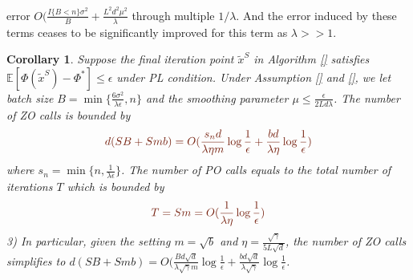 \documentclass{article}
\newcommand*{\E}{\mathbb{E}}
\newtheorem{corollary}[theorem]{Corollary}
\theoremstyle{definition}
\theoremstyle{remark}
\begin{document}
error $O(\frac{I\{B < n\} \sigma ^2}{B}+\frac{L^2 d^2 \mu^2}{\lambda}$ through multiple $1/\lambda$. And the error induced by these terms ceases to be significantly improved for this term as $\lambda >> 1$.
\begin{corollary}\label{PL-Zo-Cor}
Suppose the final iteration point $\tilde{x}^S$ in Algorithm \ref{} satisfies $\E[\Phi(\tilde{x}^S) - \Phi^*]\leq \epsilon$ under PL condition. Under Assumption \ref{} and \ref{}, we let batch size $B = \min\{\frac{6\sigma^2}{\lambda\epsilon},n\}$ and the smoothing parameter $\mu\leq \frac{\epsilon}{2Ld\lambda}$. The number of ZO calls is bounded by
\[
{\color{Brown}d(SB+Smb) = O(\frac{s_n d}{\lambda\eta m}\log\frac{1}{\epsilon}+\frac{b d}{\lambda\eta}\log\frac{1}{\epsilon})}
\]
where $s_n = \min \{n,\frac{1}{\lambda \epsilon}\}$.
The number of PO calls equals to the total number of iterations $T$ which is bounded by
\[
{\color{Brown} T = Sm = O(\frac{1}{\lambda\eta}\log\frac{1}{\epsilon})}
\]
3) In particular, given the setting  $m=\sqrt{b}$ and {\color{blue}$\eta = \frac{\sqrt{\gamma}}{5 L \sqrt{d}}$}, the number of ZO calls  simplifies to 
{\color{blue}$d(SB+Smb) = O(\frac{Bd\sqrt{d}}{\lambda\sqrt{\gamma} m}\log\frac{1}{\epsilon}+\frac{bd\sqrt{d}}{\lambda\sqrt{\gamma}}\log\frac{1}{\epsilon}$.}
\end{corollary}
\end{document}
